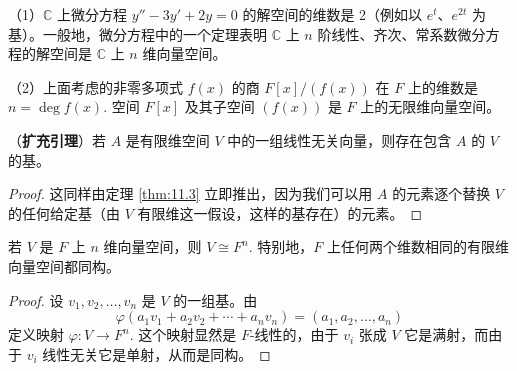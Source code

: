 \begin{example}
（1）\(\mathbb{C}\) 上微分方程 \(y''-3y'+2y = 0\) 的解空间的维数是 2（例如以 \(e^t\)、\(e^{2t}\) 为基）。一般地，微分方程中的一个定理表明 \(\mathbb{C}\) 上 \(n\) 阶线性、齐次、常系数微分方程的解空间是 \(\mathbb{C}\) 上 \(n\) 维向量空间。

（2）上面考虑的非零多项式 \(f(x)\) 的商 \(F[x]/(f(x))\) 在 \(F\) 上的维数是 \(n = \deg f(x)\). 空间 \(F[x]\) 及其子空间 \((f(x))\) 是 \(F\) 上的无限维向量空间。
\end{example}

\begin{corollary}\label{cor:11.5}
（\textbf{扩充引理}）若 \(A\) 是有限维空间 \(V\) 中的一组线性无关向量，则存在包含 \(A\) 的 \(V\) 的基。
\end{corollary}

\begin{proof}
这同样由定理 \ref{thm:11.3} 立即推出，因为我们可以用 \(A\) 的元素逐个替换 \(V\) 的任何给定基（由 \(V\) 有限维这一假设，这样的基存在）的元素。
\end{proof}

\begin{theorem}\label{thm:11.6}
若 \(V\) 是 \(F\) 上 \(n\) 维向量空间，则 \(V \cong F^n\). 特别地，\(F\) 上任何两个维数相同的有限维向量空间都同构。
\end{theorem}

\begin{proof}
设 \(v_1, v_2, \ldots, v_n\) 是 \(V\) 的一组基。由
\[
\varphi(a_1v_1+a_2v_2+\cdots+a_nv_n) = (a_1, a_2, \ldots, a_n)
\]
定义映射 \(\varphi : V \to F^n\). 这个映射显然是 \(F\)-线性的，由于 \(v_i\) 张成 \(V\) 它是满射，而由于 \(v_i\) 线性无关它是单射，从而是同构。
\end{proof}

